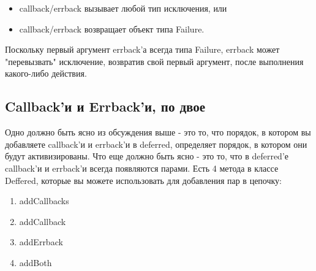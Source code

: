 \begin{itemize}

\item callback/errback вызывает любой тип исключения, или

\item callback/errback возвращает объект типа Failure.

\end{itemize}


Поскольку первый аргумент errback'а всегда типа Failure, 
errback может "перевызвать" исключение, возвратив 
свой первый аргумент, после выполнения какого-либо 
действия.


\subsection{Callback'и и Errback'и, по двое}

Одно должно быть ясно из обсуждения выше - это то, что 
порядок, в котором вы добавляете callback'и и errback'и в 
deferred, определяет порядок, в котором они будут активизированы. 
Что еще должно быть ясно - это то, что в deferred'е callback'и и 
errback'и всегда появляются парами. Есть 4 метода в классе 
Deffered, которые вы можете использовать для добавления пар 
в цепочку:

\begin{enumerate}
\item addCallbacks
\item addCallback
\item addErrback
\item addBoth
\end{enumerate}


